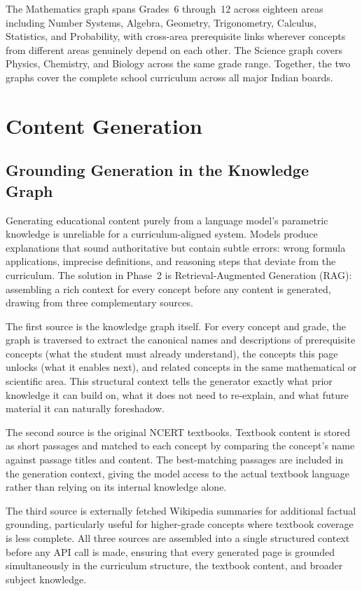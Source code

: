 \documentclass[12pt,a4paper]{article}
\begin{document}
The Mathematics graph spans Grades~6 through~12 across eighteen areas including Number Systems,
Algebra, Geometry, Trigonometry, Calculus, Statistics, and Probability, with cross-area
prerequisite links wherever concepts from different areas genuinely depend on each other.
The Science graph covers Physics, Chemistry, and Biology across the same grade range.
Together, the two graphs cover the complete school curriculum across all major Indian boards.

\section{Content Generation}

\subsection{Grounding Generation in the Knowledge Graph}

Generating educational content purely from a language model's parametric knowledge
is unreliable for a curriculum-aligned system.
Models produce explanations that sound authoritative but contain subtle errors:
wrong formula applications, imprecise definitions, and reasoning steps
that deviate from the curriculum.
The solution in Phase~2 is Retrieval-Augmented Generation (RAG): assembling a rich context for every concept
before any content is generated, drawing from three complementary sources.

The first source is the knowledge graph itself.
For every concept and grade, the graph is traversed to extract the canonical names
and descriptions of prerequisite concepts (what the student must already understand),
the concepts this page unlocks (what it enables next),
and related concepts in the same mathematical or scientific area.
This structural context tells the generator exactly what prior knowledge it can build on,
what it does not need to re-explain, and what future material it can naturally foreshadow.

The second source is the original NCERT textbooks.
Textbook content is stored as short passages and matched to each concept
by comparing the concept's name against passage titles and content.
The best-matching passages are included in the generation context,
giving the model access to the actual textbook language rather than relying on
its internal knowledge alone.

The third source is externally fetched Wikipedia summaries for additional factual grounding,
particularly useful for higher-grade concepts where textbook coverage is less complete.
All three sources are assembled into a single structured context before any API call is made,
ensuring that every generated page is grounded simultaneously in the curriculum structure,
the textbook content, and broader subject knowledge.
\end{document}
